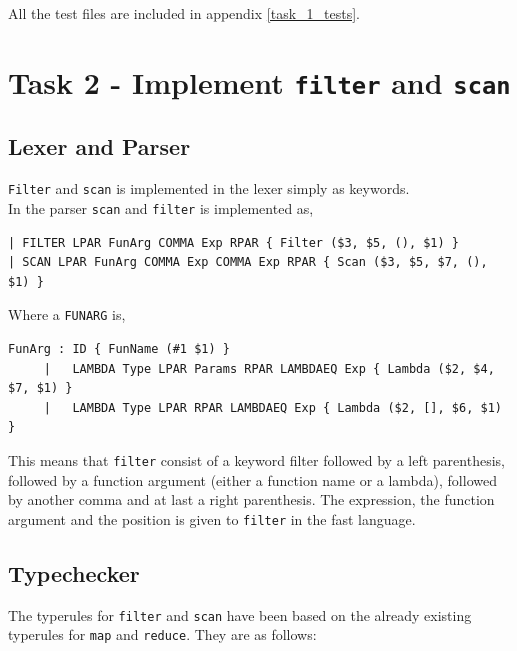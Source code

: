 \documentclass[11pt]{article}
\begin{document}
    All the test files are included in appendix \ref{task_1_tests}.

    \section{Task 2 - Implement \texttt{filter} and \texttt{scan}}
    \subsection{Lexer and Parser}
    \texttt{Filter} and \texttt{scan} is implemented in the lexer simply as
    keywords.\\

    In the parser \texttt{scan} and \texttt{filter} is implemented as,

    \begin{lstlisting}[firstnumber=107]
| FILTER LPAR FunArg COMMA Exp RPAR { Filter ($3, $5, (), $1) }
| SCAN LPAR FunArg COMMA Exp COMMA Exp RPAR { Scan ($3, $5, $7, (), $1) }
    \end{lstlisting}

    Where a \texttt{FUNARG} is,

    \begin{lstlisting}[firstnumber=125]
FunArg : ID { FunName (#1 $1) }
     |   LAMBDA Type LPAR Params RPAR LAMBDAEQ Exp { Lambda ($2, $4, $7, $1) }
     |   LAMBDA Type LPAR RPAR LAMBDAEQ Exp { Lambda ($2, [], $6, $1) }
    \end{lstlisting}

    This means that \texttt{filter} consist of a keyword filter followed by a
    left parenthesis, followed by a function argument (either a function name or
    a lambda), followed by another comma and at last a right parenthesis.  The
    expression, the function argument and the position is given to
    \texttt{filter} in the fast language.

    \subsection{Typechecker}
    The typerules for \texttt{filter} and \texttt{scan} have been based on the
    already existing typerules for \texttt{map} and \texttt{reduce}. They are as
    follows: \\
\end{document}
